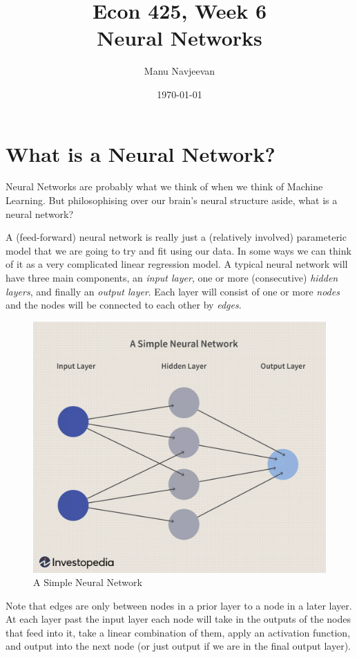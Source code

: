 \documentclass[10pt]{article}
\title{Econ 425, Week 6 \\ \large Neural Networks}%
\author{Manu Navjeevan}
\date{\today}
\begin{document}
\maketitle

\section{What is a Neural Network?}%
\label{sec:}

Neural Networks are probably what we think of when we think of Machine Learning. But philosophising over our brain's neural structure aside, what is a neural network?

A (feed-forward) neural network is really just a (relatively involved) parameteric model that we are going to try and fit using our data. In some ways we can think of it as a very complicated linear regression model. A typical neural network will have three main components, an \textit{input layer}, one or more (consecutive) \textit{hidden layers}, and finally an \textit{output layer}. Each layer will consist of one or more \textit{nodes} and the nodes will be connected to each other by \textit{edges}.
\begin{figure}[htb!]
	\centering
	\includegraphics[width=0.7\linewidth]{neural-simple.png}
	\caption{A Simple Neural Network}%
	\label{fig:neural-simple}
\end{figure}

Note that edges are only between nodes in a prior layer to a node in a later layer. At each layer past the input layer each node will take in the outputs of the nodes that feed into it, take a linear combination of them, apply an activation function, and output into the next node (or just output if we are in the final output layer). 
\end{document}
